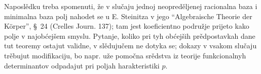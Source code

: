 \documentclass[11pt]{article}
\begin{document}
Naposlědku treba spomenuti, že v slučaju jednoj neopreděljenej racionalna baza i minimalna baza polj nahodet se u E. Steinitza v jego ``Algebraische Theorie der Körper'', \S\ 24 (Crelles Journ. 137); tam jest koeficientno podružje prijeto kako polje v najobćejšem smyslu. Pytanje, koliko pri tyh obćejših prědpostavkah dane tut teoremy ostajut validne, v slědujučem ne dotyka se; dokazy v vsakom slučaju trěbujut modifikaciju, bo napr. uže pomočna srědstva iz teorije funkcionalnyh determinantov odpadajut pri poljah harakteristiki $p$.
\end{document}
